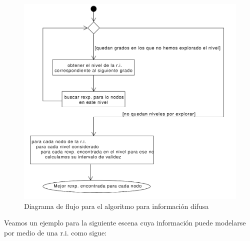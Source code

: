 \documentclass[10pt,a4paper]{article}
\begin{document}
\begin{figure}[H]
\centering
\includegraphics[scale=0.5]{img/diagramaFlujoAlgFuzzy.png}
\caption{Diagrama de flujo para el algoritmo para información difusa}
\end{figure}

Veamos un ejemplo para la siguiente escena cuya información puede modelarse por medio de una r.i. como sigue:

\begin{figure}[H]
\end{figure}
\end{document}
